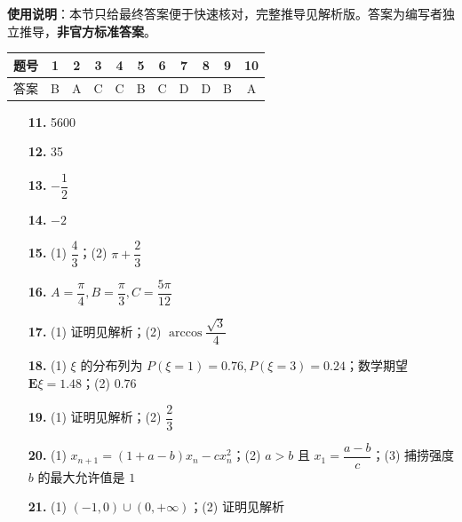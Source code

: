
\begin{gknotice}
\textbf{使用说明}：本节只给最终答案便于快速核对，完整推导见解析版。答案为编写者独立推导，\textbf{非官方标准答案}。
\end{gknotice}

\begin{center}\begin{tabular}{ccccccccccc}
\toprule
题号 & 1 & 2 & 3 & 4 & 5 & 6 & 7 & 8 & 9 & 10 \\
\midrule
答案 & B & A & C & C & B & C & D & D & B & A \\
\bottomrule
\end{tabular}\end{center}

\begin{itemize}[leftmargin=2.6em]
  \item[\textbf{11.}] 5600
  \item[\textbf{12.}] 35
  \item[\textbf{13.}] $-\dfrac{1}{2}$
  \item[\textbf{14.}] $-2$
  \item[\textbf{15.}] (1) $\dfrac{4}{3}$；(2) $\pi + \dfrac{2}{3}$
\end{itemize}

\begin{itemize}[leftmargin=2.6em]
  \item[\textbf{16.}] $A = \dfrac{\pi}{4}, B = \dfrac{\pi}{3}, C = \dfrac{5\pi}{12}$
  \item[\textbf{17.}] (1) 证明见解析；(2) $\arccos \dfrac{\sqrt{3}}{4}$
  \item[\textbf{18.}] (1) $\xi$ 的分布列为 $P(\xi=1)=0.76, P(\xi=3)=0.24$；数学期望 $\mathbf{E}\xi = 1.48$；(2) $0.76$
  \item[\textbf{19.}] (1) 证明见解析；(2) $\dfrac{2}{3}$
  \item[\textbf{20.}] (1) $x_{n+1} = (1 + a - b)x_n - cx_n^2$；(2) $a > b$ 且 $x_1 = \dfrac{a - b}{c}$；(3) 捕捞强度 $b$ 的最大允许值是 $1$
  \item[\textbf{21.}] (1) $(-1, 0) \cup (0, +\infty)$；(2) 证明见解析
\end{itemize}
